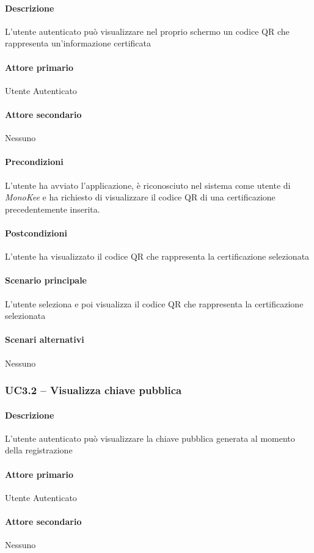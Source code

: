 \paragraph{Descrizione}  L’utente autenticato può visualizzare nel proprio schermo un codice QR che rappresenta un’informazione certificata
\paragraph{Attore primario}  Utente Autenticato
\paragraph{Attore secondario}  Nessuno
\paragraph{Precondizioni}  L’utente ha avviato l’applicazione, è riconosciuto nel sistema come utente di \textit{MonoKee} e ha richiesto di visualizzare il codice QR di una certificazione precedentemente inserita.
\paragraph{Postcondizioni}  L’utente ha visualizzato il codice QR che rappresenta la certificazione selezionata
\paragraph{Scenario principale}  
L’utente seleziona e poi visualizza il codice QR che rappresenta la certificazione selezionata
\paragraph{Scenari alternativi}  Nessuno


\subsubsection{UC3.2 – Visualizza chiave pubblica}
\paragraph{Descrizione}  L’utente autenticato può visualizzare la chiave pubblica generata al momento della registrazione
\paragraph{Attore primario}  Utente Autenticato
\paragraph{Attore secondario}  Nessuno
